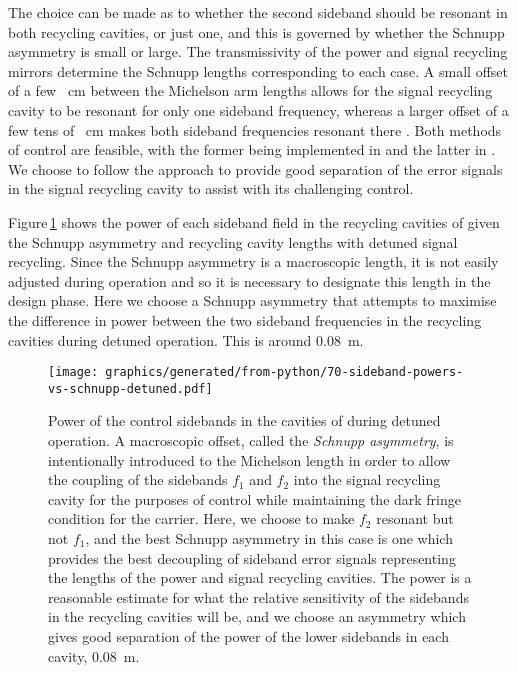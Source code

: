The choice can be made as to whether the second sideband should be resonant in both recycling cavities, or just one, and this is governed by whether the Schnupp asymmetry is small or large. The transmissivity of the power and signal recycling mirrors determine the Schnupp lengths corresponding to each case. A small offset of a few \SI{}{\centi\meter} between the Michelson arm lengths allows for the signal recycling cavity to be resonant for only one sideband frequency, whereas a larger offset of a few tens of \SI{}{\centi\meter} makes both sideband frequencies resonant there \cite{Vajente2008}. Both methods of control are feasible, with the former being implemented in \ALIGO{} \cite{Abbott2010} and the latter in \KAGRA{} \cite{kagra2013}. We choose to follow the \ALIGO{} approach to provide good separation of the error signals in the signal recycling cavity to assist with its challenging control.

Figure\,\ref{fig:sideband-powers-vs-schnupp-detuned} shows the power of each sideband field in the recycling cavities of \ETLF{} given the Schnupp asymmetry and recycling cavity lengths with detuned signal recycling. Since the Schnupp asymmetry is a macroscopic length, it is not easily adjusted during operation and so it is necessary to designate this length in the design phase. Here we choose a Schnupp asymmetry that attempts to maximise the difference in power between the two sideband frequencies in the recycling cavities during detuned operation. This is around \SI{0.08}{\meter}.

\begin{figure}
  \centering
  \texttt{[image: graphics/generated/from-python/70-sideband-powers-vs-schnupp-detuned.pdf]}
  \caption[Power of the control sidebands in the cavities of \ETLF{} in the detuned configuration]{\label{fig:sideband-powers-vs-schnupp-detuned}Power of the control sidebands in the cavities of \ETLF{} during detuned operation. A macroscopic offset, called the \emph{Schnupp asymmetry}, is intentionally introduced to the Michelson length in order to allow the coupling of the sidebands $f_1$ and $f_2$ into the signal recycling cavity for the purposes of control while maintaining the dark fringe condition for the carrier. Here, we choose to make $f_2$ resonant but not $f_1$, and the best Schnupp asymmetry in this case is one which provides the best decoupling of sideband error signals representing the lengths of the power and signal recycling cavities. The power is a reasonable estimate for what the relative sensitivity of the sidebands in the recycling cavities will be, and we choose an asymmetry which gives good separation of the power of the lower sidebands in each cavity, \SI{0.08}{\meter}.}
\end{figure}

